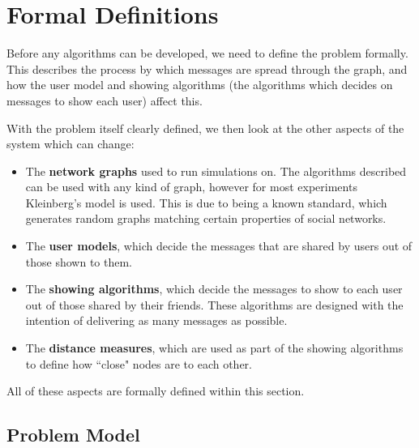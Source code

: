 \documentclass[bsc,frontabs,twoside,singlespacing,parskip,deptreport]{infthesis}     %
\begin{document}
\chapter{Formal Definitions}

Before any algorithms can be developed, we need to define the problem formally. This describes the process by which messages are spread through the graph, and how the user model and showing algorithms (the algorithms which decides on messages to show each user) affect this.

With the problem itself clearly defined, we then look at the other aspects of the system which can change:
\begin{itemize}
\item The \textbf{network graphs} used to run simulations on. The algorithms described can be used with any kind of graph, however for most experiments Kleinberg's model is used. This is due to being a known standard, which generates random graphs matching certain properties of social networks.
\item The \textbf{user models}, which decide the messages that are shared by users out of those shown to them.
\item The \textbf{showing algorithms}, which decide the messages to show to each user out of those shared by their friends. These algorithms are designed with the intention of delivering as many messages as possible.
\item The \textbf{distance measures}, which are used as part of the showing algorithms to define how ``close" nodes are to each other.
\end{itemize}

All of these aspects are formally defined within this section.

\section{Problem Model}
\end{document}
